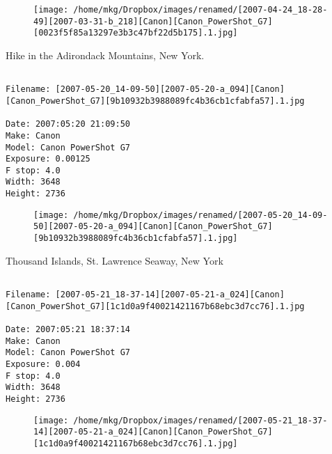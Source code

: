 \begin{figure}
\texttt{[image: /home/mkg/Dropbox/images/renamed/[2007-04-24\_18-28-49][2007-03-31-b\_218][Canon][Canon\_PowerShot\_G7][0023f5f85a13297e3b3c47bf22d5b175].1.jpg]}
\end{figure}
    
\clearpage
\onecolumn
\noindent Hike in the Adirondack Mountains, New York.
\noindent
\begin{lstlisting}

Filename: [2007-05-20_14-09-50][2007-05-20-a_094][Canon][Canon_PowerShot_G7][9b10932b3988089fc4b36cb1cfabfa57].1.jpg

Date: 2007:05:20 21:09:50
Make: Canon
Model: Canon PowerShot G7
Exposure: 0.00125
F stop: 4.0
Width: 3648
Height: 2736
\end{lstlisting}
\clearpage

\begin{figure}
\texttt{[image: /home/mkg/Dropbox/images/renamed/[2007-05-20\_14-09-50][2007-05-20-a\_094][Canon][Canon\_PowerShot\_G7][9b10932b3988089fc4b36cb1cfabfa57].1.jpg]}
\end{figure}
    
\clearpage
\onecolumn
\noindent Thousand Islands, St. Lawrence Seaway, New York
\noindent
\begin{lstlisting}

Filename: [2007-05-21_18-37-14][2007-05-21-a_024][Canon][Canon_PowerShot_G7][1c1d0a9f40021421167b68ebc3d7cc76].1.jpg

Date: 2007:05:21 18:37:14
Make: Canon
Model: Canon PowerShot G7
Exposure: 0.004
F stop: 4.0
Width: 3648
Height: 2736
\end{lstlisting}
\clearpage

\begin{figure}
\texttt{[image: /home/mkg/Dropbox/images/renamed/[2007-05-21\_18-37-14][2007-05-21-a\_024][Canon][Canon\_PowerShot\_G7][1c1d0a9f40021421167b68ebc3d7cc76].1.jpg]}
\end{figure}
    
